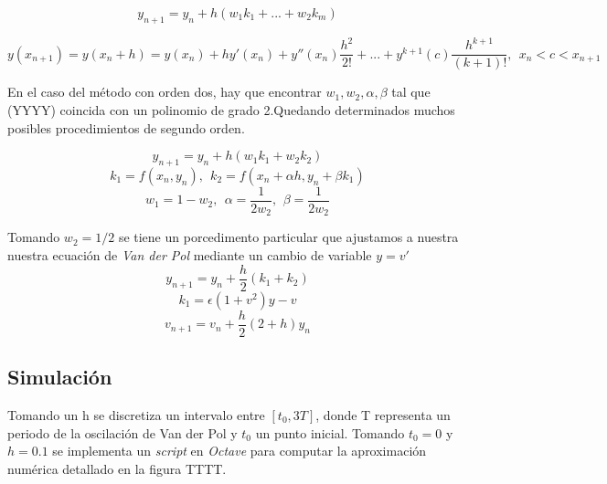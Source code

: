 \documentclass[a4paper, 10pt, spanish]{article}
\begin{document}
\begin{equation}
y_{n+1} = y_n + h(w_1k_1 + ... + w_2k_m) 
\end{equation}

\begin{equation}
y(x_{n+1}) = y(x_n+h) = y(x_n) + hy'(x_n) + y''(x_n)\frac{h^2}{2!} +...+ y^{k+1}(c)\frac{h^{k+1}}{(k+1)!},\ \ x_n < c < x_{n+1} \nonumber
\end{equation}

En el caso del método con orden dos, hay que encontrar $w_1, w_2, \alpha, \beta$ tal que (YYYY) coincida con un polinomio de grado 2.Quedando determinados muchos posibles procedimientos de segundo orden.

\begin{equation}
y_{n+1} = y_n +h(w_1k_1 + w_2k_2) \nonumber
\end{equation}
\begin{equation}
k_1 = f(x_n,y_n),\ \ k_2= f(x_n+\alpha h, y_n + \beta k_1) \nonumber 
\end{equation}
\begin{equation}
w_1 = 1 - w_2,\ \ \alpha=\frac{1}{2w_2},\ \, \beta = \frac{1}{2w_2} \nonumber
\end{equation}

Tomando $w_2 = 1/2$ se tiene un porcedimento particular que ajustamos a nuestra nuestra ecuación de \textit{Van der Pol} mediante un cambio de variable $y = v'$
\begin{equation}
y_{n+1}  = y_n + \frac{h}{2}(k_1 + k_2)
\end{equation}
\begin{equation}
k_1 = \epsilon (1+v^2)y - v \nonumber
\end{equation}
\begin{equation}
v_{n+1} = v_n +\frac{h}{2}(2+h)y_n \nonumber
\end{equation}

\subsection{Simulación}
Tomando un h se discretiza un intervalo entre $[t_0, 3T]$, donde T representa un periodo de la oscilación de Van der Pol y $t_0$ un punto inicial. Tomando $t_0 = 0$ y $h=0.1$ se implementa un \textit{script} en \textit{Octave} para computar la aproximación numérica detallado en la figura TTTT.
\end{document}
